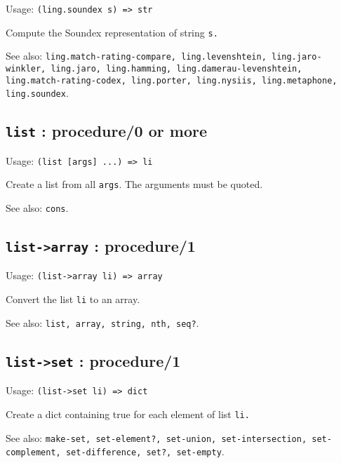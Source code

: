 \documentclass[
]{article}
\newcommand{\passthrough}[1]{#1}
\begin{document}
Usage: \passthrough{\lstinline!(ling.soundex s) => str!}

Compute the Soundex representation of string
\passthrough{\lstinline!s.!}

See also:
\passthrough{\lstinline!ling.match-rating-compare, ling.levenshtein, ling.jaro-winkler, ling.jaro, ling.hamming, ling.damerau-levenshtein, ling.match-rating-codex, ling.porter, ling.nysiis, ling.metaphone, ling.soundex!}.

\hypertarget{list-procedure0-or-more-1}{%
\subsection{\texorpdfstring{\texttt{list} : procedure/0 or
more}{list : procedure/0 or more}}\label{list-procedure0-or-more-1}}

Usage: \passthrough{\lstinline!(list [args] ...) => li!}

Create a list from all \passthrough{\lstinline!args!}. The arguments
must be quoted.

See also: \passthrough{\lstinline!cons!}.

\hypertarget{list-array-procedure1-1}{%
\subsection{\texorpdfstring{\texttt{list-\textgreater{}array} :
procedure/1}{list-\textgreater array : procedure/1}}\label{list-array-procedure1-1}}

Usage: \passthrough{\lstinline!(list->array li) => array!}

Convert the list \passthrough{\lstinline!li!} to an array.

See also: \passthrough{\lstinline!list, array, string, nth, seq?!}.

\hypertarget{list-set-procedure1-1}{%
\subsection{\texorpdfstring{\texttt{list-\textgreater{}set} :
procedure/1}{list-\textgreater set : procedure/1}}\label{list-set-procedure1-1}}

Usage: \passthrough{\lstinline!(list->set li) => dict!}

Create a dict containing true for each element of list
\passthrough{\lstinline!li.!}

See also:
\passthrough{\lstinline!make-set, set-element?, set-union, set-intersection, set-complement, set-difference, set?, set-empty!}.
\end{document}
